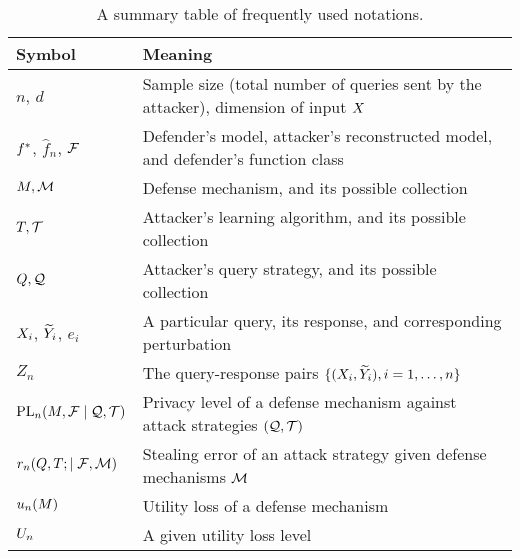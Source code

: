         \begin{table}[tb]
            \centering
            \begin{tabular}{lp{12.5cm}}
                \toprule
                \textbf{Symbol} & \textbf{Meaning} \\
                 \midrule
                $n$, $d$ & Sample size (total number of queries sent by the attacker), dimension of input $X$\\ \midrule
                $f^*$, $\hat{f}_n$, $\mathcal{F}$ & Defender's model, attacker's reconstructed model, and defender's function class\\ \midrule
                $M, \mathcal{M}$ & Defense mechanism, and its possible collection \\
                \midrule
                $T, \mathcal{T}$ & Attacker's learning algorithm, and its possible collection \\
                \midrule
                $Q, \mathcal{Q}$ & Attacker's query strategy, and its possible collection \\
                \midrule
                $X_i$, $\widetilde{Y}_i$, $e_i$ & A particular query, its response, and corresponding perturbation\\ \midrule
                $Z_n$ & The query-response pairs $\{(X_i, \widetilde{Y}_i),i=1,\dots,n\}$\\ \midrule
                $\textrm{PL}_n(M,\mathcal{F} \mid \mathcal{Q}, \mathcal{T})$ & Privacy level of a defense mechanism against attack strategies $(\mathcal{Q}, \mathcal{T})$ \\ \midrule
               $r_n(Q, T;\mid \mathcal{F},\mathcal{M})$ & Stealing error of an attack strategy given defense mechanisms $\mathcal{M}$ \\ \midrule
                $u_n(M)$ & Utility loss of a defense mechanism \\ \midrule
                $U_n$ & A given utility loss level  \\ 
                 \bottomrule
            \end{tabular}
            \caption{A summary table of frequently used notations.}
            \label{tab:notation_1}
        \end{table}